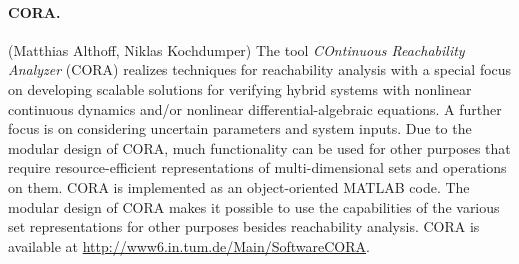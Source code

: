 \documentclass[EPiC]{easychair}
\begin{document}
\paragraph{CORA.} (Matthias Althoff, Niklas Kochdumper) The tool \textit{COntinuous Reachability Analyzer} (CORA) \cite{Althoff2015a, Althoff2016a} realizes techniques for reachability analysis with a special focus on developing scalable solutions for verifying hybrid systems with nonlinear continuous dynamics and/or nonlinear differential-algebraic equations. A further focus is on considering uncertain parameters and system inputs. Due to the modular design of CORA, much functionality can be used for other purposes that require resource-efficient representations of multi-dimensional sets and operations on them. CORA is implemented as an object-oriented MATLAB code. The modular design of CORA makes it possible to use the capabilities of the various set representations for other purposes besides reachability analysis. CORA is available at \url{http://www6.in.tum.de/Main/SoftwareCORA}.

\end{document}
